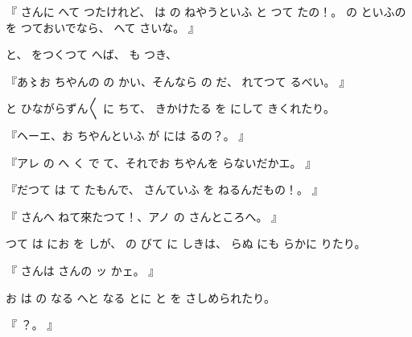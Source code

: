 『
さんに
へて
つたけれど、
は
の
ねやうといふ
と
つて
たの！。
の
といふのを
つておいでなら、
へて
さいな。
』

と、
をつくつて
へば、
も
つき、

『あ〻お
ちやんの
の
かい、そんなら
の
だ、
れてつて
るべい。
』

と
ひながらずん〳〵
に
ちて、
きかけたる
を
にして
きくれたり。

『ヘーエ、お
ちやんといふ
が
には
るの？。
』

『アレ
の
へ
く
で
て、それでお
ちやんを
らないだかエ。
』

『だつて
は
て
たもんで、
さんていふ
を
ねるんだもの！。
』

『
さんへ
ねて來たつて！、アノ
の
さんところへ。
』

つて
は
にお
を
しが、
の
びて
に
しきは、
らぬ
にも
らかに
りたり。

『
さんは
さんの
ッ
かェ。
』

お
は
の
なる
へと
なる
とに
と
を
さしめられたり。

『
？。
』

